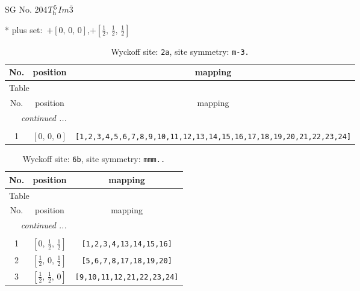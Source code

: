 \documentclass[fleqn,8pt]{jsarticle}
\begin{document}
\setcounter{MaxMatrixCols}{32}

\renewcommand{\tablename}{Table~}
\renewcommand{\figurename}{Figure~}
\begin{center}
\LARGE
SG No. 204\quad$T_{\rm h}^{5}$\quad$Im\bar{3}$\quad[ cubic ]
\end{center}
* plus set:\,\,\,$+\left[ 0,\, 0,\, 0 \right]$,\quad $+\left[ \frac{1}{2},\, \frac{1}{2},\, \frac{1}{2} \right]$
\renewcommand{\arraystretch}{1.2}
\begin{longtable}{ccc}
\caption{Wyckoff site: {\tt 2a}, site symmetry: {\tt m-3.}}
 \\
 \hline \hline
No. & position & mapping \\ \hline \endfirsthead

\multicolumn{2}{l}{\tablename\ \thetable{}} \\
 \hline \hline
No. & position & mapping \\ \hline \endhead

 \hline \hline
\multicolumn{2}{r}{\footnotesize\it continued ...} \\ \endfoot

 \hline \hline
\multicolumn{2}{r}{} \\ \endlastfoot

1 & $\left[ 0,\, 0,\, 0 \right]$ & {\tt [1,2,3,4,5,6,7,8,9,10,11,12,13,14,15,16,17,18,19,20,21,22,23,24]} \\
\end{longtable}
\renewcommand{\arraystretch}{1.2}
\begin{longtable}{ccc}
\caption{Wyckoff site: {\tt 6b}, site symmetry: {\tt mmm..}}
 \\
 \hline \hline
No. & position & mapping \\ \hline \endfirsthead

\multicolumn{2}{l}{\tablename\ \thetable{}} \\
 \hline \hline
No. & position & mapping \\ \hline \endhead

 \hline \hline
\multicolumn{2}{r}{\footnotesize\it continued ...} \\ \endfoot

 \hline \hline
\multicolumn{2}{r}{} \\ \endlastfoot

1 & $\left[ 0,\, \frac{1}{2},\, \frac{1}{2} \right]$ & {\tt [1,2,3,4,13,14,15,16]} \\ \hline
2 & $\left[ \frac{1}{2},\, 0,\, \frac{1}{2} \right]$ & {\tt [5,6,7,8,17,18,19,20]} \\ \hline
3 & $\left[ \frac{1}{2},\, \frac{1}{2},\, 0 \right]$ & {\tt [9,10,11,12,21,22,23,24]} \\
\end{longtable}
\end{document}
